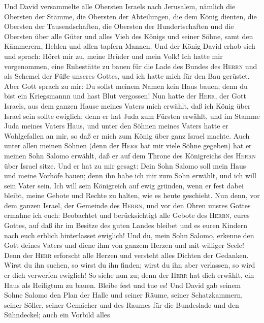  Und David versammelte alle Obersten Israels nach
Jerusalem, nämlich die Obersten der Stämme, die Obersten der
Abteilungen, die dem König dienten, die Obersten der Tausendschaften,
die Obersten der Hundertschaften und die Obersten über alle Güter und
alles Vieh des Königs und seiner Söhne, samt den Kämmerern, Helden und
allen tapfern Mannen.  Und der König David erhob sich und
sprach: Höret mir zu, meine Brüder und mein Volk! Ich hatte mir
vorgenommen, eine Ruhestätte zu bauen für die Lade des Bundes des
\textsc{Herrn} und als Schemel der Füße unseres Gottes, und ich hatte
mich für den Bau gerüstet.  Aber Gott sprach zu mir: Du
sollst meinem Namen kein Haus bauen; denn du bist ein Kriegsmannn und
hast Blut vergossen!  Nun hatte der \textsc{Herr}, der
Gott Israels, aus dem ganzen Hause meines Vaters mich erwählt, daß ich
König über Israel sein sollte ewiglich; denn er hat Juda zum Fürsten
erwählt, und im Stamme Juda meines Vaters Haus, und unter den Söhnen
meines Vaters hatte er Wohlgefallen an mir, so daß er mich zum König
über ganz Israel machte.  Auch unter allen meinen Söhnen
(denn der \textsc{Herr} hat mir viele Söhne gegeben) hat er meinen Sohn
Salomo erwählt, daß er auf dem Throne des Königreichs des \textsc{Herrn}
über Israel sitze.  Und er hat zu mir gesagt: Dein Sohn
Salomo soll mein Haus und meine Vorhöfe bauen; denn ihn habe ich mir zum
Sohn erwählt, und ich will sein Vater sein.  Ich will sein
Königreich auf ewig gründen, wenn er fest dabei bleibt, meine Gebote und
Rechte zu halten, wie es heute geschieht.  Nun denn, vor
dem ganzen Israel, der Gemeinde des \textsc{Herrn}, und vor den Ohren
unsres Gottes ermahne ich euch: Beobachtet und berücksichtigt alle
Gebote des \textsc{Herrn}, eures Gottes, auf daß ihr im Besitze des
guten Landes bleibet und es euren Kindern nach euch erblich hinterlasset
ewiglich!  Und du, mein Sohn Salomo, erkenne den Gott
deines Vaters und diene ihm von ganzem Herzen und mit williger Seele!
Denn der \textsc{Herr} erforscht alle Herzen und versteht alles Dichten
der Gedanken. Wirst du ihn suchen, so wirst du ihn finden; wirst du ihn
aber verlassen, so wird er dich verwerfen ewiglich!  So
siehe nun zu; denn der \textsc{Herr} hat dich erwählt, ein Haus als
Heiligtum zu bauen. Bleibe fest und tue es!  Und David
gab seinem Sohne Salomo den Plan der Halle und seiner Räume, seiner
Schatzkammern, seiner Söller, seiner Gemächer und des Raumes für die
Bundeslade und den Sühndeckel;  auch ein Vorbild alles
